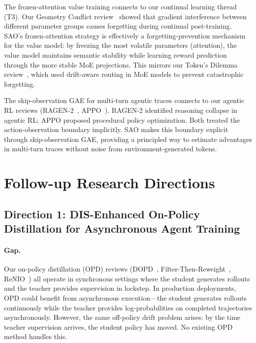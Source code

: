 \documentclass[11pt,a4paper]{article}
\begin{document}
The frozen-attention value training connects to our continual learning thread (T3). Our Geometry Conflict review~\cite{geomconflict2026} showed that gradient interference between different parameter groups causes forgetting during continual post-training. SAO's frozen-attention strategy is effectively a forgetting-prevention mechanism for the value model: by freezing the most volatile parameters (attention), the value model maintains semantic stability while learning reward prediction through the more stable MoE projections. This mirrors our Token's Dilemma review~\cite{tokensdilemma2026}, which used drift-aware routing in MoE models to prevent catastrophic forgetting.

The skip-observation GAE for multi-turn agentic traces connects to our agentic RL reviews (RAGEN-2~\cite{ragen2026}, APPO~\cite{appo2026}). RAGEN-2 identified reasoning collapse in agentic RL; APPO proposed procedural policy optimization. Both treated the action-observation boundary implicitly. SAO makes this boundary explicit through skip-observation GAE, providing a principled way to estimate advantages in multi-turn traces without noise from environment-generated tokens.

\section{Follow-up Research Directions}

\subsection{Direction 1: DIS-Enhanced On-Policy Distillation for Asynchronous Agent Training}

\paragraph{Gap.} Our on-policy distillation (OPD) reviews (DOPD~\cite{dopd2026}, Filter-Then-Reweight~\cite{ftr2026}, ReNIO~\cite{renio2026}) all operate in synchronous settings where the student generates rollouts and the teacher provides supervision in lockstep. In production deployments, OPD could benefit from asynchronous execution---the student generates rollouts continuously while the teacher provides log-probabilities on completed trajectories asynchronously. However, the same off-policy drift problem arises: by the time teacher supervision arrives, the student policy has moved. No existing OPD method handles this.
\end{document}
